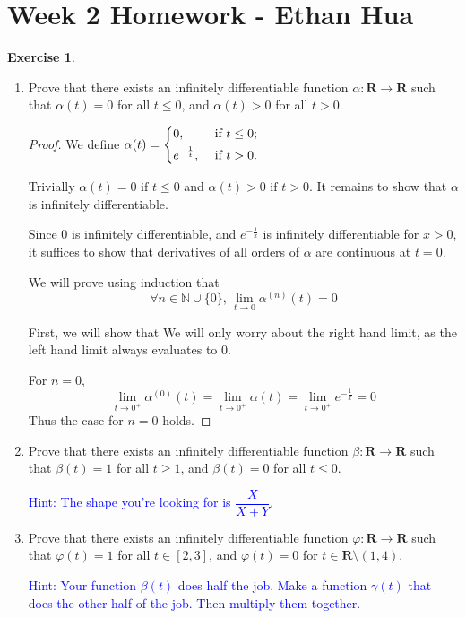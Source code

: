 \documentclass{article}
\newcommand{\R}{\mathbf{R}}
\theoremstyle{plain} %
\numberwithin{thm}{section} %
\theoremstyle{definition}
\newtheorem{exercise}[thm]{Exercise} %
\begin{document}
    \section{Week 2 Homework - Ethan Hua}
    \begin{exercise}
        \begin{enumerate}[label=(\alph*)]
            \item Prove that there exists an infinitely differentiable function $\alpha:\R\rightarrow \R$ such that $\alpha(t)=0$ for all $t\leq 0$, and $\alpha(t)>0$ for all $t>0$.
    
            \begin{proof}
                We define \(\alpha (t) =
                \begin{dcases}
                    0, &\text{ if } t \leq 0 ;\\
                    e^{-\frac{1}{t}} , &\text{ if } t > 0.\\
                \end{dcases}\) 
                
                Trivially \(\alpha (t) = 0 \text{ if } t \leq 0\) and \(\alpha (t) > 0 \text{ if }t > 0\). It remains to show that \(\alpha \) is infinitely differentiable.

                Since \(0\) is infinitely differentiable, and \(e^{-\frac{1}{x}}\) is infinitely differentiable for \(x > 0\), it suffices to show that derivatives of all orders of \(\alpha \) are continuous at \(t = 0\).

                We will prove using induction that
                \[
                    \forall n \in \mathbb{N} \cup \{0\} \text{, } \lim_{t \to 0} \alpha ^{(n)} (t) = 0
                \]

                First, we will show that 
                We will only worry about the right hand limit, as the left hand limit always evaluates to \(0\).

                For \(n = 0\),
                \[
                    \lim_{t \to 0^+} \alpha ^{(0)} (t) = \lim_{t \to 0^+} \alpha (t) = \lim_{t \to 0^+} e^{-\frac{1}{x}} = 0
                \]
                Thus the case for \(n = 0\) holds.

            \end{proof}
    
            \item Prove that there exists an infinitely differentiable function $\beta:\R\rightarrow \R$ such that $\beta(t)=1$ for all $t\geq 1$, and $\beta(t)=0$ for all $t\leq 0$.
    
            \textcolor{blue}{Hint: The shape you're looking for is $\dfrac{X}{X+Y}$.}
    
            \item Prove that there exists an infinitely differentiable function $\varphi:\R\rightarrow \R$ such that $\varphi(t)=1$ for all $t\in [2,3]$, and $\varphi(t)=0$ for $t\in \R\setminus (1,4)$.
    
            \textcolor{blue}{Hint: Your function $\beta(t)$ does half the job. Make a function $\gamma(t)$ that does the other half of the job. Then multiply them together.}
        \end{enumerate}
    \end{exercise}
\end{document}
